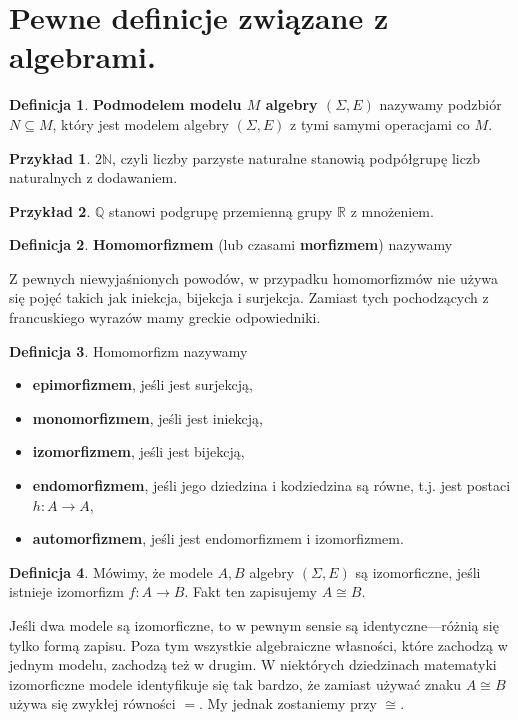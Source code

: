 \documentclass{article}
\theoremstyle{definition}
\newtheorem{definition}{Definicja}[section]
\newtheorem{example}{Przykład}[section]
\begin{document}
\section{Pewne definicje związane z algebrami.}

\begin{definition}
    \textbf{Podmodelem modelu $M$ algebry $(\Sigma, E)$} nazywamy podzbiór $N \subseteq M$,
		który jest modelem algebry $(\Sigma, E)$ z tymi samymi operacjami co $M$.
\end{definition}

\begin{example}
	$2\mathbb{N}$, czyli liczby parzyste naturalne stanowią podpółgrupę liczb naturalnych z dodawaniem.
\end{example}
\begin{example}
	$\mathbb{Q}$ stanowi podgrupę przemienną grupy $\mathbb{R}$ z mnożeniem.
\end{example}

\begin{definition}
    \textbf{Homomorfizmem} (lub czasami \textbf{morfizmem}) nazywamy
\end{definition}

Z pewnych niewyjaśnionych powodów,
    w przypadku homomorfizmów nie używa się pojęć takich jak iniekcja, bijekcja i surjekcja.
Zamiast tych pochodzących z francuskiego wyrazów mamy greckie odpowiedniki.

\begin{definition}
    Homomorfizm nazywamy
    \begin{itemize}
        \item \textbf{epimorfizmem}, jeśli jest surjekcją,
        \item \textbf{monomorfizmem}, jeśli jest iniekcją,
        \item \textbf{izomorfizmem}, jeśli jest bijekcją,
        \item \textbf{endomorfizmem}, jeśli jego dziedzina i kodziedzina są równe, t.j. jest postaci $h:A \to A$,
        \item \textbf{automorfizmem}, jeśli jest endomorfizmem i izomorfizmem.
    \end{itemize}
\end{definition}

\begin{definition}
	Mówimy, że modele $A, B$ algebry $(\Sigma, E)$ są izomorficzne,
		jeśli istnieje izomorfizm $f: A \to B$.
	Fakt ten zapisujemy $A \cong B$.
\end{definition}
Jeśli dwa modele są izomorficzne, to w pewnym sensie są identyczne---różnią się tylko formą zapisu.
Poza tym wszystkie algebraiczne własności,
	które zachodzą w jednym modelu,
	zachodzą też w drugim.
W niektórych dziedzinach matematyki izomorficzne modele identyfikuje się tak bardzo,
	że zamiast używać znaku $A \cong B$ używa się zwykłej równości $=$.
My jednak zostaniemy przy $\cong$.
\end{document}
